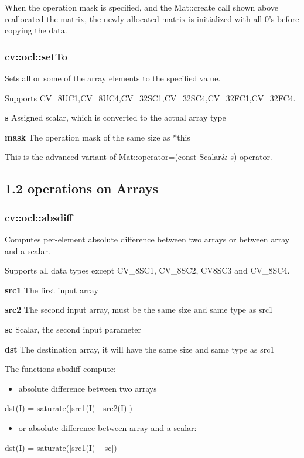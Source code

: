 \documentclass{article}
\begin{document}
When the operation mask is specified, and the Mat::create call shown above
reallocated the matrix, the newly allocated matrix is initialized with all
0's before copying the data.

\newpage

\subsubsection{cv::ocl::setTo}
\label{subsubsec:mylabel3}
Sets all or some of the array elements to the specified value.

Supports CV{\_}8UC1,CV{\_}8UC4,CV{\_}32SC1,CV{\_}32SC4,CV{\_}32FC1,CV{\_}32FC4.

\textbf{s }Assigned scalar, which is converted to the actual array type

\textbf{mask }The operation mask of the same size as *this

This is the advanced variant of Mat::operator=(const Scalar{\&} s) operator.

\newpage

\subsection{1.2 operations on Arrays}
\label{subsec:mylabel2}
\subsubsection{cv::ocl::absdiff}
\label{subsubsec:mylabel4}
Computes per-element absolute difference between two arrays or between array
and a scalar.

Supports all data types except CV{\_}8SC1, CV{\_}8SC2, CV8SC3 and
CV{\_}8SC4.

\textbf{src1 }The first input array

\textbf{src2 }The second input array, must be the same size and same type as
src1

\textbf{sc }Scalar, the second input parameter

\textbf{dst }The destination array, it will have the same size and same type
as src1

The functions absdiff compute:

\begin{itemize}
\item absolute difference between two arrays
\end{itemize}
dst(I) = saturate($\vert $src1(I) - src2(I)$\vert )$

\begin{itemize}
\item or absolute difference between array and a scalar:
\end{itemize}
dst(I) = saturate($\vert $src1(I) -- sc$\vert )$
\end{document}
